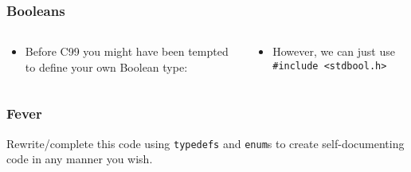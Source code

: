 \begin{frame}[fragile]
\frametitle{Booleans}
\begin{columns}

\begin{column}{0.45\textwidth}
\begin{itemize}[<+->]
\item Before C99 you might have been tempted to define your own Boolean type:
\end{itemize}

\end{column}

\begin{column}{0.45\textwidth}
\begin{itemize}[<+->]
\item However, we can just use \verb^#include <stdbool.h>^
\end{itemize}

\end{column}

\end{columns}
\end{frame}


\begin{frame}[fragile]
\frametitle{Fever}
Rewrite/complete this code using \verb^typedefs^ and \verb^enum^s to
create self-documenting code in any manner you wish.

\end{frame}

